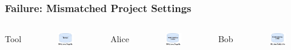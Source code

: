         \begin{frame}
            \frametitle{Failure: Mismatched Project Settings}
             \begin{columns}
                    \centering Tool
                    \begin{figure}
                        \centering
                        \includegraphics[width=0.45\linewidth]{figures/tomcat.jpg}
                    \end{figure}

                    \centering Alice
                    \begin{figure}
                        \centering
                        \includegraphics[width=0.45\linewidth]{figures/privaterepo.jpg}
                    \end{figure}

                    \centering Bob
                    \begin{figure}
                        \centering
                        \includegraphics[width=0.45\linewidth]{figures/privaterepobob.jpg}
                    \end{figure}
             \end{columns}
        \end{frame}

